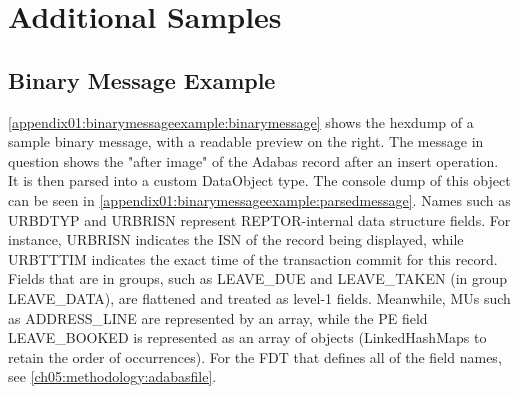 \chapter{Additional Samples}

\section{Binary Message Example}
\label{appendix01:binarymessageexample}
\ref{appendix01:binarymessageexample:binarymessage} shows the hexdump of a sample binary message, with a readable preview on the right. The message in question shows the "after image" of the Adabas record after an insert operation. It is then parsed into a custom DataObject type. The console dump of this object can be seen in \ref{appendix01:binarymessageexample:parsedmessage}. Names such as URBDTYP and URBRISN represent \ac{REPTOR}-internal data structure fields. For instance, URBRISN indicates the \ac{ISN} of the record being displayed, while URBTTTIM indicates the exact time of the transaction commit for this record. Fields that are in groups, such as LEAVE\_DUE and LEAVE\_TAKEN (in group LEAVE\_DATA), are flattened and treated as level-1 fields. Meanwhile, MUs such as ADDRESS\_LINE are represented by an array, while the PE field LEAVE\_BOOKED is represented as an array of objects (LinkedHashMaps to retain the order of occurrences). For the \ac{FDT} that defines all of the field names, see \ref{ch05:methodology:adabasfile}.

